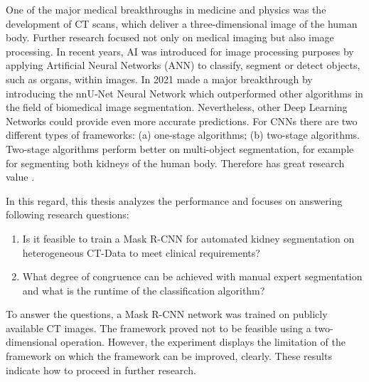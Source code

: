  One of the major medical breakthroughs in medicine and physics was the development of \acl{CT} scans, which deliver a three-dimensional image of the human body. Further research focused not only on medical imaging but also image processing. In recent years, \acl{AI} was introduced for image processing purposes by applying Artificial Neural Networks (ANN) to classify, segment or detect objects, such as organs, within images. 
In 2021  \cite{Isensee.2021}  made a major breakthrough by introducing the nnU-Net Neural Network which outperformed other algorithms in the field of biomedical image segmentation. Nevertheless, other Deep Learning Networks could provide even more accurate predictions. For \acl{CNN}s there are two different types of frameworks: (a) one-stage algorithms; (b)  two-stage algorithms. Two-stage algorithms perform better on multi-object segmentation, for example for segmenting both kidneys of the human body. Therefore   \cite{He.op.2017} has great research value \cite{Shu.2020}.
 
 
In this regard, this thesis analyzes the performance  and focuses on answering following research questions:

\begin{enumerate}
    \item Is it feasible to train a Mask R-CNN for automated kidney segmentation on heterogeneous
    CT-Data to meet clinical requirements?
    \item What degree of congruence can be achieved with manual expert segmentation and what is
    the runtime of the classification algorithm?
\end{enumerate}


To answer the questions, a Mask R-CNN  network was trained on publicly available \ac{CT} images. 
 The framework proved not to be feasible using a two-dimensional operation. However, the experiment displays the limitation of the framework on which the framework can be improved, clearly.
These results indicate how to proceed in further research.